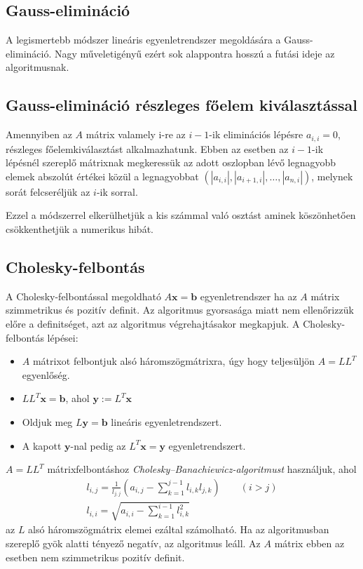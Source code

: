 		\subsection{Gauss-elimináció}
		
			A legismertebb módszer lineáris egyenletrendszer megoldására a Gauss-elimináció. Nagy műveletigényű ezért sok alappontra hosszú a futási ideje az algoritmusnak.  
		
		\subsection{Gauss-elimináció részleges főelem kiválasztással}
		
			Amennyiben az $A$ mátrix valamely i-re az $i-1$-ik eliminációs lépésre $a_{i,i}=0$, részleges főelemkiválasztást alkalmazhatunk. Ebben az esetben az $i-1$-ik lépésnél szereplő mátrixnak megkeressük az adott oszlopban lévő legnagyobb elemek abszolút értékei közül a legnagyobbat $(|a_{i,i}|, |a_{i+1,i}|,\ldots, |a_{n,i}|)$, melynek sorát felcseréljük az $i$-ik sorral.  
			
			Ezzel a módszerrel elkerülhetjük a kis számmal való osztást aminek köszönhetően csökkenthetjük a numerikus hibát. \cite{ge}
			
		\subsection{Cholesky-felbontás}\label{sssec:num1}
		
			A Cholesky-felbontással megoldható $A\mathbf{x}=\mathbf{b}$ egyenletrendszer ha az $A$ mátrix szimmetrikus és pozitív definit. Az algoritmus gyorsasága miatt nem ellenőrizzük előre a definitséget, azt az algoritmus végrehajtásakor megkapjuk. 
			A Cholesky-felbontás \cite{cf} lépései:
			\begin{itemize}
				\item $A$ mátrixot felbontjuk alsó háromszögmátrixra, úgy hogy teljesüljön $A=LL^T$ egyenlőség.
				\item $LL^T\mathbf{x}=\mathbf{b}$, ahol $\mathbf{y}:=L^T\mathbf{x}$
				\item Oldjuk meg $L\mathbf{y}=\mathbf{b}$ lineáris egyenletrendszert.
				\item A kapott $\mathbf{y}$-nal pedig az $L^T\mathbf{x}=\mathbf{y}$ egyenletrendszert.
			\end{itemize} 
			$A=LL^T$ mátrixfelbontáshoz \textit{Cholesky--Banachiewicz-algoritmust} használjuk, ahol
		 	\begin{gather*}
		 		l_{i,j}=\frac{1}{l_{j,j}}(a_{i,j}-\sum_{k=1}^{j-1}l_{i,k}l_{j,k}) \qquad (i>j)\\
		 		l_{i,i} = \sqrt{a_{i,i}-\sum_{k=1}^{i-1}l_{i,k}^2}
		 	\end{gather*}
		 	az $L$ alsó háromszögmátrix elemei ezáltal számolható. Ha az algoritmusban szereplő gyök alatti tényező negatív, az algoritmus leáll. Az $A$ mátrix ebben az esetben nem szimmetrikus pozitív definit.
		 	
		 	
		 	
		 	
	 	
		 
